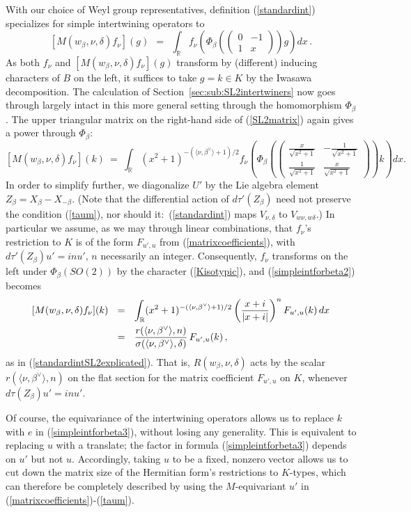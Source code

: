 \documentclass[12pt]{article}
\newcommand{\secref}[1]{Section~\ref{#1}}
\numberwithin{equation}{section}
\renewcommand\b{\beta}
\renewcommand\d{\delta}
\newcommand\f{\frac}
\newcommand{\R}{{\mathbb{R}}}
\renewcommand\({\left(}
\renewcommand\){\right)}
\newcommand{\ttwo}[4]{
\(\begin{smallmatrix}{#1} & {#2}
\\ {#3} & {#4} \end{smallmatrix}\)}
\begin{document}
With our choice of Weyl group representatives,
definition (\ref{standardint}) specializes for simple intertwining operators to
\begin{equation}\label{simpleintforbeta1}
  [M(w_\b,\nu,\d)f_\nu](g) \ \  = \ \ \int_{\R} f_\nu\(\Phi_\b(\ttwo{0}{-1}1x)g\)dx\,.
\end{equation}
As both $f_\nu$ and $[M(w_\b,\nu,\d)f_\nu](g)$ transform by (different) inducing characters of $B$ on the left, it suffices to take $g=k\in K$ by the Iwasawa decomposition.
The calculation of \secref{sec:sub:SL2intertwiners} now  goes through largely intact in this more general setting through the homomorphism $\Phi_\beta$.   The upper triangular matrix on the right-hand side of (\ref{SL2matrix}) again gives a power  through $\Phi_\beta$:
\begin{equation}\label{simpleintforbeta2}
  [M(w_\b,\nu,\d)f_\nu](k) \ = \ \int_{\R} (x^2+1)^{-(\langle \nu,\beta^\vee\rangle+1)/2} f_\nu\(\!\Phi_\b\!\(\!\ttwo{\frac{x}{\sqrt{x^2+1}}}{-\frac{1}{\sqrt{x^2+1}}}{
\frac{1}{\sqrt{x^2+1}}}{\frac{x}{\sqrt{x^2+1}}} \! \) k \! \)dx.
\end{equation}
In order to simplify further, we diagonalize $U'$ by the Lie algebra element $Z_\beta=X_\b-X_{-\b}$.  (Note that the differential action of $d\tau'(Z_\beta)$ need not preserve the condition   (\ref{taum}), nor should it:~(\ref{standardint}) maps $V_{\nu,\delta}$ to $V_{w\nu,w\delta}$.)
  In particular we assume, as we may through linear combinations, that $f_\nu$'s restriction to $K$ is of the form $F_{u',u}$ from (\ref{matrixcoefficients}), with $d\tau'(Z_\b)u'=inu'$,  $n$  necessarily an integer.  Consequently, $f_\nu$ transforms on the left under $\Phi_\b(SO(2))$ by the character (\ref{Kisotypic}), and (\ref{simpleintforbeta2}) becomes
\begin{equation}\label{simpleintforbeta3}
\aligned
  [M(w_\b,\nu,\d)f_\nu](k) \ \  & = \ \ \int_{\R} (x^2+1)^{-(\langle \nu,\beta^\vee\rangle+1)/2} \(\f{x+i}{|x+i|}\)^n F_{u',u}(k)\, dx \\
 & = \ \ \frac{r(\langle \nu,\b^\vee\rangle,n)}{ \sigma(\langle \nu,\b^\vee\rangle,\delta)}\,F_{u',u}(k)\,,
\endaligned
\end{equation}
as in (\ref{standardintSL2explicated}).
That is, $R(w_\beta,\nu,\delta)$ acts by the scalar $r(\langle \nu,\b^\vee\rangle,n)$ on the flat section for the matrix coefficient  $F_{u',u}$ on $K$, whenever $d\tau(Z_\b)u'=inu'$.

Of course, the equivariance of the intertwining operators allows us to  replace $k$ with $e$ in (\ref{simpleintforbeta3}), without losing any generality.  This is equivalent to replacing $u$ with a translate;  the factor in formula (\ref{simpleintforbeta3}) depends on $u'$ but not $u$.  Accordingly, taking $u$ to be a fixed, nonzero vector allows us to cut down the matrix size of the Hermitian form's restrictions to $K$-types, which can therefore be completely described by using the $M$-equivariant $u'$ in (\ref{matrixcoefficients})-(\ref{taum}).
\end{document}
